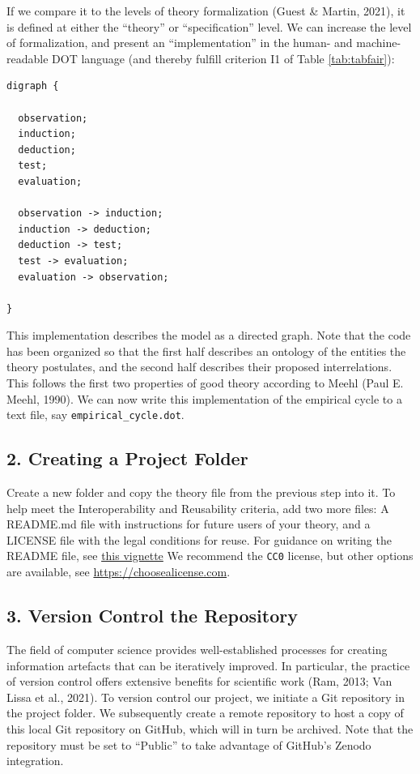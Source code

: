 \documentclass[
  man,floatsintext]{apa6}
\begin{document}
If we compare it to the levels of theory formalization (Guest \& Martin, 2021),
it is defined at either the ``theory'' or ``specification'' level.
We can increase the level of formalization, and present an ``implementation'' in the human- and machine-readable DOT language (and thereby fulfill criterion I1 of Table \ref{tab:tabfair}):

\begin{verbatim}
digraph {

  observation;
  induction;
  deduction;
  test;
  evaluation;
  
  observation -> induction;
  induction -> deduction;
  deduction -> test;
  test -> evaluation;
  evaluation -> observation;
  
}
\end{verbatim}

This implementation describes the model as a directed graph.
Note that the code has been organized so that the first half describes an ontology of the entities the theory postulates,
and the second half describes their proposed interrelations.
This follows the first two properties of good theory according to Meehl (Paul E. Meehl, 1990).
We can now write this implementation of the empirical cycle to a text file, say \texttt{empirical\_cycle.dot}.

\subsection{2. Creating a Project Folder}\label{creating-a-project-folder}

Create a new folder and copy the theory file from the previous step into it.
To help meet the Interoperability and Reusability criteria,
add two more files:
A README.md file with instructions for future users of your theory,
and a LICENSE file with the legal conditions for reuse.
For guidance on writing the README file, see \href{https://cjvanlissa.github.io/theorytools/articles/readme.html}{this vignette}
We recommend the \texttt{CC0} license, but other options are available, see \href{https://choosealicense.com/non-software/}{https://choosealicense.com}.

\subsection{3. Version Control the Repository}\label{version-control-the-repository}

The field of computer science provides well-established processes for creating information artefacts that can be iteratively improved.
In particular, the practice of version control offers extensive benefits for scientific work (Ram, 2013; Van Lissa et al., 2021).
To version control our project, we initiate a Git repository in the project folder.
We subsequently create a remote repository to host a copy of this local Git repository on GitHub, which will in turn be archived.
Note that the repository
must be set to ``Public'' to take advantage of GitHub's Zenodo integration.
\end{document}
